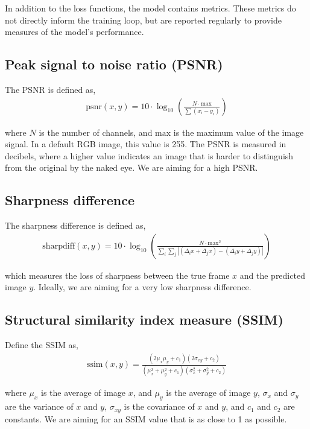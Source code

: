 \documentclass{article}
\begin{document}
In addition to the loss functions, the model contains metrics. These metrics do not directly inform the training loop, but are reported regularly to provide measures of the model's performance.

\subsection*{Peak signal to noise ratio (PSNR)}

The PSNR is defined as,
\begin{align*}
    \mathrm{psnr}(x, y) = 10 \cdot \log_{10}\left( \frac{N \cdot
    \mathrm{max}}{\sum (x_i - y_i)} \right)
\end{align*}

where $N$ is the number of channels, and $\mathrm{max}$ is the maximum value of the image signal. In a default RGB image, this value is 255. The PSNR is measured in decibels, where a higher value indicates an image that is harder to distinguish from the original by the naked eye. We are aiming for a high PSNR. 

\subsection*{Sharpness difference}

The sharpness difference is defined as,
\begin{align*}
    \mathrm{sharpdiff}(x, y) = 10 \cdot \log_{10}\left(\frac{N \cdot
    \mathrm{max}^2}{\sum_i \sum_j |(\Delta_i x + \Delta_j x) - (\Delta_i
    y + \Delta_j y)|}\right)
\end{align*}

which measures the loss of sharpness between the true frame $x$ and the predicted image $y$. Ideally, we are aiming for a very low sharpness difference.

\subsection*{Structural similarity index measure (SSIM)}

Define the SSIM \cite{ssim} as,
\begin{align*}
    \mathrm{ssim}(x, y) = \frac{(2\mu_x\mu_y + c_1)(2\sigma_{xy} + c_2)}
    {(\mu_x^2 + \mu_y^2 + c_1)(\sigma_x^2 + \sigma_y^2 + c_2)}
\end{align*}

where $\mu_x$ is the average of image $x$, and $\mu_y$ is the average of image $y$, $\sigma_x$ and $\sigma_y$ are the variance of $x$ and $y$, $\sigma_{xy}$ is the covariance of $x$ and $y$, and $c_1$ and $c_2$ are constants. We are aiming for an SSIM value that is as close to 1 as possible. 
\end{document}
